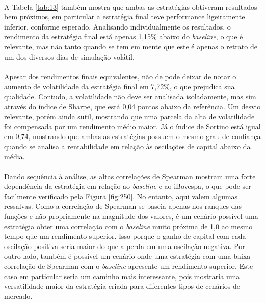 \paragraph{} A Tabela \ref{tab:13} também mostra que ambas as estratégias obtiveram resultados bem próximos, em particular a estratégia final teve performance ligeiramente inferior, conforme esperado. Analisando individualmente os resultados, o rendimento da estratégia final está apenas 1,15\% abaixo do \textit{baseline}, o que é relevante, mas não tanto quando se tem em mente que este é apenas o retrato de um dos diversos dias de simulação volátil.

\paragraph{} Apesar dos rendimentos finais equivalentes, não de pode deixar de notar o aumento de volatilidade da estratégia final em 7,72\%, o que prejudica sua qualidade. Contudo, a volatilidade não deve ser analisada isoladamente, mas sim através do índice de Sharpe, que está 0,04 pontos abaixo da referência. Um desvio relevante, porém ainda sutil, mostrando que uma parcela da alta de volatilidade foi compensada por um rendimento médio maior. Já o índice de Sortino está igual em 0,74, mostrando que ambas as estratégias possuem o mesmo grau de confiança quando se analisa a rentabilidade em relação às oscilações de capital abaixo da média.

\paragraph{} Dando sequência à análise, as altas correlações de Spearman mostram uma forte dependência da estratégia em relação ao \textit{baseline} e ao iBovespa, o que pode ser facilmente verificado pela Figura \ref{fig:250}. No entanto, aqui valem algumas ressalvas. Como a correlação de Spearman se baseia apenas nos ranques das funções e não propriamente na magnitude dos valores, é um cenário possível uma estratégia obter uma correlação com o \textit{baseline} muito próxima de 1,0 ao mesmo tempo que um rendimento superior. Isso porque o ganho de capital com cada oscilação positiva seria maior do que a perda em uma oscilação negativa. Por outro lado, também é possível um cenário onde uma estratégia com uma baixa correlação de Spearman com o \textit{baseline} apresente um rendimento superior. Este caso em particular seria um caminho mais interessante, pois mostraria uma versatilidade maior da estratégia criada para diferentes tipos de cenários de mercado.

